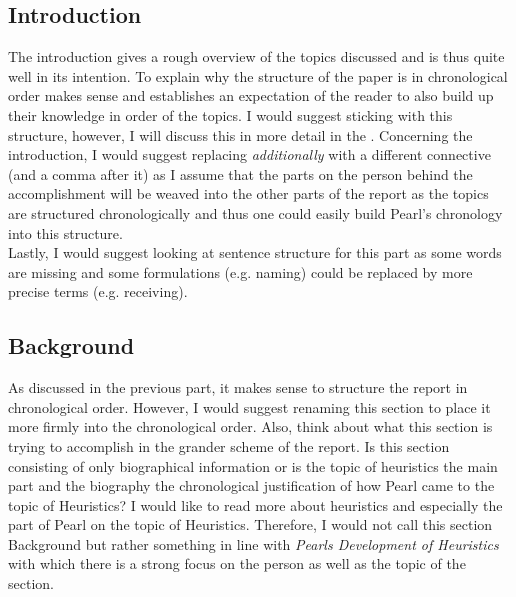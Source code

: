 \documentclass{article}
\begin{document}
\subsection{Introduction}
The introduction gives a rough overview of the topics discussed and is thus quite well in its intention. To explain why the structure of the paper is in chronological order makes sense and establishes an expectation of the reader to also build up their knowledge in order of the topics. I would suggest sticking with this structure, however, I will discuss this in more detail in the . Concerning the introduction, I would suggest replacing \textit{additionally} with a different connective (and a comma after it) as I assume that the parts on the person behind the accomplishment will be weaved into the other parts of the report as the topics are structured chronologically and thus one could easily build Pearl's chronology into this structure.\\
Lastly, I would suggest looking at sentence structure for this part as some words are missing and some formulations (e.g. naming) could be replaced by more precise terms (e.g. receiving).

\subsection{Background}
As discussed in the previous part, it makes sense to structure the report in chronological order. However, I would suggest renaming this section to place it more firmly into the chronological order. Also, think about what this section is trying to accomplish in the grander scheme of the report. Is this section consisting of only biographical information or is the topic of heuristics the main part and the biography the chronological justification of how Pearl came to the topic of Heuristics? I would like to read more about heuristics and especially the part of Pearl on the topic of Heuristics. Therefore, I would not call this section Background but rather something in line with \textit{Pearls Development of Heuristics} with which there is a strong focus on the person as well as the topic of the section.
\end{document}

